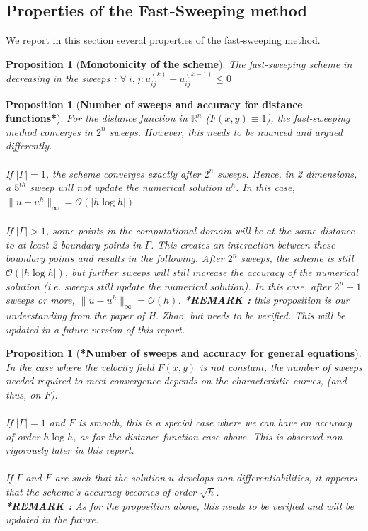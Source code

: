 \documentclass[11pt]{article}
\newtheorem{prop}[theorem]{Proposition}
\theoremstyle{definition}
\theoremstyle{remark}
\newcommand{\R}{\mathbb{R}}
\begin{document}
\subsection{Properties of the Fast-Sweeping method}
We report in this section several properties of the fast-sweeping method.
\begin{prop}[\textbf{Monotonicity of the scheme}]
The fast-sweeping scheme in decreasing in the sweeps : $\forall{}\ i,j:u^{(k)}_{ij}-u^{(k-1)}_{ij}\leq0$
\end{prop}
\begin{prop}[\textbf{Number of sweeps and accuracy for distance functions*}]
\label{prop_distance_functions}
    For the distance function in $\R^n$ ($F(x,y)\equiv1$), the fast-sweeping method converges in $2^n$ sweeps. However, this needs to be nuanced and argued differently. \\ \\
    If $|\Gamma|=1$, the scheme converges exactly after $2^n$ sweeps. Hence, in 2 dimensions, a $5^{th}$ sweep will not update the numerical solution $u^h$. In this case, $\|u-u^h\|_{\infty}=\mathcal{O}(|h\log h|)$ \\ \\
    If $|\Gamma|>1$, some points in the computational domain will be at the same distance to at least 2 boundary points in $\Gamma$. This creates an interaction between these boundary points and results in the following. After $2^n$ sweeps, the scheme is still $\mathcal{O}(|h\log h|)$, but further sweeps will still increase the accuracy of the numerical solution (i.e. sweeps still update the numerical solution). In this case, after $2^n+1$ sweeps or more, $\|u-u^h\|_\infty=\mathcal{O}(h)$. \textbf{*REMARK : } this proposition is our understanding from the paper of H. Zhao, but needs to be verified. This will be updated in a future version of this report.
\end{prop}

\begin{prop}[\textbf{*Number of sweeps and accuracy for general equations}]
\label{prop_general_equations}
    In the case where the velocity field $F(x,y)$ is not constant, the number of sweeps needed required to meet convergence depends on the characteristic curves, (and thus, on $F$). \\ \\
    If $|\Gamma|=1$ and $F$ is smooth, this is a special case where we can have an accuracy of order $h\log h$, as for the distance function case above. This is observed non-rigorously later in this report. \\ \\
    If $\Gamma$ and $F$ are such that the solution $u$ develops non-differentiabilities, it appears that the scheme's accuracy becomes of order $\sqrt{h}$. \\
    \textbf{*REMARK : } As for the proposition above, this needs to be verified and will be updated in the future.
\end{prop}
\end{document}
